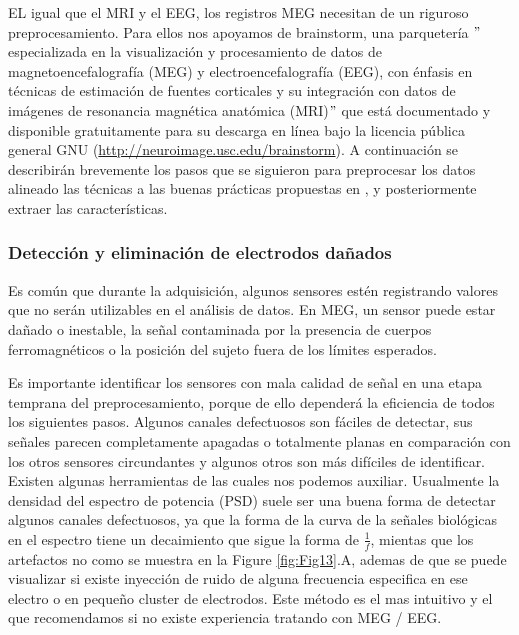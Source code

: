 \documentclass[11pt,letterpaper]{article}
\numberwithin{equation}{subsection}
\numberwithin{table}{subsection}
\begin{document}
\smallskip
\noindent EL igual que el MRI y el EEG, los registros MEG necesitan de un riguroso preprocesamiento. Para ellos nos apoyamos de brainstorm, una parquetería $"$ especializada en la visualización y procesamiento de datos de magnetoencefalografía (MEG) y electroencefalografía (EEG), con énfasis en técnicas de estimación de fuentes corticales y su integración con datos de imágenes de resonancia magnética anatómica (MRI)$"$ \cite{tadel2011brainstorm} que está documentado y disponible gratuitamente para su descarga en línea bajo la licencia pública general GNU (\url{http://neuroimage.usc.edu/brainstorm}). A continuación se describirán brevemente los pasos que se siguieron para preprocesar los datos alineado las técnicas a las buenas prácticas propuestas en \cite{gross2013good}, y posteriormente extraer las características. 

\subsubsection{Detección y eliminación de electrodos dañados}

\bigskip
\noindent Es común que durante la adquisición, algunos sensores estén registrando valores que no serán utilizables en el análisis de datos. En MEG, un sensor puede estar dañado o inestable, la señal contaminada por la presencia de cuerpos ferromagnéticos o la posición del sujeto fuera de los límites esperados.

\bigskip
\noindent Es importante identificar los sensores con mala calidad de señal en una etapa temprana del preprocesamiento, porque de ello dependerá la eficiencia de todos los siguientes pasos. Algunos canales defectuosos son fáciles de detectar, sus señales parecen completamente apagadas o totalmente planas en comparación con los otros sensores circundantes y algunos otros son más difíciles de identificar. Existen algunas herramientas de las cuales nos podemos auxiliar. Usualmente la densidad del espectro de potencia (PSD) suele ser una buena forma de detectar algunos canales defectuosos, ya que la forma de la curva de la señales biológicas en el espectro tiene un decaimiento que sigue la forma de $\frac{1}{f}$, mientas que los artefactos no como se muestra en la Figure \ref{fig:Fig13}.A, ademas de que se puede visualizar si existe inyección de ruido de alguna frecuencia especifica en ese electro o en pequeño cluster de electrodos. Este método es el mas intuitivo y el que recomendamos si no existe experiencia tratando con MEG / EEG.  
\end{document}
